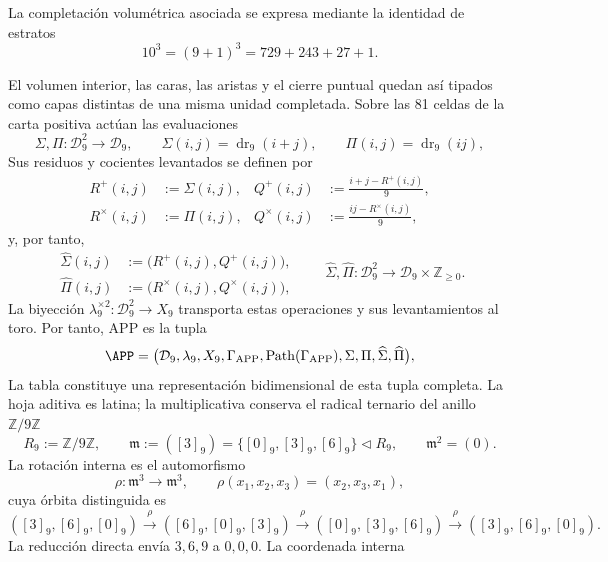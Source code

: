 La completación volumétrica asociada se expresa mediante la identidad de
estratos
\begin{equation}
10^3=(9+1)^3=729+243+27+1.
\label{p12-83-c3-s1:eq:completion-unit}
\end{equation}

El volumen interior, las caras, las aristas y el cierre puntual quedan así
tipados como capas distintas de una misma unidad completada. Sobre las 81
celdas de la carta positiva actúan las evaluaciones
\[
\Sigma,\Pi:\mathcal D_9^2\longrightarrow\mathcal D_9,
\qquad
\Sigma(i,j)=\operatorname{dr}_9(i+j),
\qquad
\Pi(i,j)=\operatorname{dr}_9(ij),
\]
Sus residuos y cocientes levantados se definen por
\[
\begin{aligned}
R^+(i,j)&:=\Sigma(i,j),&
Q^+(i,j)&:=\frac{i+j-R^+(i,j)}9,\\
R^\times(i,j)&:=\Pi(i,j),&
Q^\times(i,j)&:=\frac{ij-R^\times(i,j)}9,
\end{aligned}
\]
y, por tanto,
\[
\begin{aligned}
\widehat\Sigma(i,j)&:=\bigl(R^+(i,j),Q^+(i,j)\bigr),\\
\widehat\Pi(i,j)&:=\bigl(R^\times(i,j),Q^\times(i,j)\bigr),
\end{aligned}
\qquad
\widehat\Sigma,\widehat\Pi:
\mathcal D_9^2\longrightarrow\mathcal D_9\times\mathbb Z_{\geq0}.
\]
La biyección \(\lambda_9^{\times2}:\mathcal D_9^2\to X_9\) transporta
estas operaciones y sus levantamientos al toro. Por tanto, APP es la tupla
\begin{equation}
\APP=\bigl(\mathcal D_9,\lambda_9,X_9,\Gamma_{\rm APP},
\operatorname{Path}(\Gamma_{\rm APP}),
\Sigma,\Pi,\widehat\Sigma,\widehat\Pi\bigr),
\label{p12-83-c3-s1:eq:app-full-definition-public}
\end{equation}
La tabla constituye una representación bidimensional de esta tupla
completa. La hoja aditiva es latina; la multiplicativa conserva
el radical ternario del anillo \(\mathbb Z/9\mathbb Z\)
\begin{equation}
R_9:=\mathbb Z/9\mathbb Z,
\qquad
\mathfrak m:=([3]_9)=\{[0]_9,[3]_9,[6]_9\}\triangleleft R_9,
\qquad \mathfrak m^2=(0).
\label{p12-83-c3-s1:eq:app-radical-369}
\end{equation}
La rotación interna es el automorfismo
\[
\rho:\mathfrak m^3\longrightarrow\mathfrak m^3,
\qquad \rho(x_1,x_2,x_3)=(x_2,x_3,x_1),
\]
cuya órbita distinguida es
\[
([3]_9,[6]_9,[0]_9)\xrightarrow{\rho}
([6]_9,[0]_9,[3]_9)\xrightarrow{\rho}
([0]_9,[3]_9,[6]_9)\xrightarrow{\rho}
([3]_9,[6]_9,[0]_9).
\]
La reducción directa envía \(3,6,9\) a \(0,0,0\). La coordenada interna
